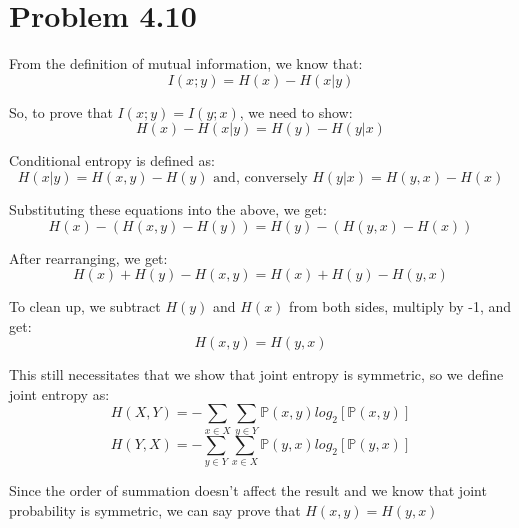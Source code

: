 \documentclass{article}
\begin{document}
\section*{Problem 4.10}
From the definition of mutual information, we know that:
\[I(x;y) = H(x) - H(x|y)\]

So, to prove that $I(x;y) = I(y;x)$, we need to show:
\[H(x) - H(x|y) = H(y) - H(y|x)\]

Conditional entropy is defined as:
 \[H(x|y) = H(x,y) - H(y) \text{ and, conversely } H(y|x) = H(y,x) - H(x)\]


Substituting these equations into the above, we get:
\[H(x) - (H(x,y) - H(y)) = H(y) - (H(y, x) - H(x))\]

After rearranging, we get:
\[H(x) + H(y) - H(x,y) = H(x) + H(y) - H(y, x)\]

To clean up, we subtract $H(y)$ and $H(x)$ from both sides, multiply by -1, and get:
\[H(x,y) = H(y,x)\]

This still necessitates that we show that joint entropy is symmetric, so we define joint entropy as:
\[ H(X,Y) = -\sum_{x\in X} \sum_{y \in Y} \mathbb{P}(x,y)log_2[\mathbb{P}(x,y)]\]
\[ H(Y,X) = -\sum_{y \in Y} \sum_{x\in X} \mathbb{P}(y,x)log_2[\mathbb{P}(y,x)]\]

Since the order of summation doesn't affect the result and we know that joint probability is symmetric, we can say prove that $H(x,y) = H(y,x) $
\end{document}
